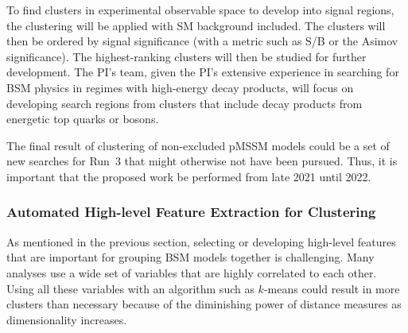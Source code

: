\documentclass[letter, USenglish, 11pt, subfigure]{article}
\begin{document}
To find clusters in experimental observable space to develop into signal regions, the clustering will be applied with SM background included. The clusters will then be ordered by signal significance (with a metric such as S/B or the Asimov significance). The highest-ranking clusters will then be studied for further development. The PI's team, given the PI's extensive experience in searching for BSM physics in regimes with high-energy decay products, will focus on developing search regions from clusters that include decay products from energetic top quarks or bosons. 

The final result of clustering of non-excluded pMSSM models could be a set of new searches for Run~3 that might otherwise not have been pursued. Thus, it is important that the proposed work be performed from late 2021 until 2022.

\subsubsection{Automated High-level Feature Extraction for Clustering}
As mentioned in the previous section, selecting or developing high-level features that are important for grouping BSM models together is challenging. Many analyses use a wide set of variables that are highly correlated to each other. Using all these variables with an algorithm such as $k$-means could result in more clusters than necessary because of the diminishing power of distance measures as dimensionality increases. 
\end{document}
